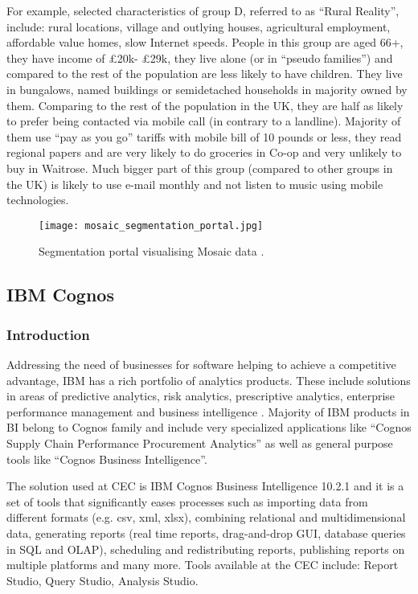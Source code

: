 For example, selected characteristics of group D, referred to as “Rural Reality”, include: rural locations, village and outlying houses, agricultural employment, affordable value homes, slow Internet speeds. People in this group are aged 66+, they have income of £20k- £29k, they live alone (or in “pseudo families”) and compared to the rest of the population are less likely to have children. They live in bungalows, named buildings or semidetached households in majority owned by them. Comparing to the rest of the population in the UK, they are half as likely to prefer being contacted via  mobile call (in contrary to a landline). Majority of them use “pay as you go” tariffs with mobile bill of 10 pounds or less, they read regional papers and are very likely to do groceries in Co-op and very unlikely to buy in Waitrose. Much bigger part of this group (compared to other groups in the UK) is likely to use e-mail monthly and not listen to music using mobile technologies. 

\begin{figure}
\centering
     \texttt{[image: mosaic\_segmentation\_portal.jpg]}
      \caption{Segmentation portal visualising Mosaic data \citep{Experian2014}.}
       \label{normal_case}
\end{figure}



		\subsection{IBM Cognos}
		
			\subsubsection{Introduction}
			
Addressing the need of businesses for software helping to achieve a competitive advantage, IBM has a rich portfolio of analytics products. These include solutions in areas of predictive analytics, risk analytics, prescriptive analytics, enterprise performance management and business intelligence \citep{IBM2015b}. Majority of IBM products in BI belong to Cognos family and include very specialized applications like “Cognos Supply Chain Performance Procurement Analytics” as well as general purpose tools like “Cognos Business Intelligence”.

The solution used at CEC is IBM Cognos Business Intelligence 10.2.1 and it is a set of tools that significantly eases processes such as importing data from different formats (e.g. csv, xml, xlsx), combining relational and multidimensional data, generating reports (real time reports, drag-and-drop GUI, database queries in SQL and OLAP), scheduling and redistributing reports, publishing reports on multiple platforms and many more. Tools available at the CEC include: Report Studio, Query Studio, Analysis Studio.

